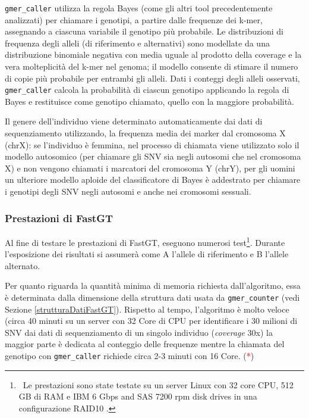 \documentclass[../main.tex]{subfiles}
\begin{document}
\texttt{gmer\_caller} utilizza la regola Bayes (come gli altri tool precedentemente analizzati) per chiamare i genotipi, a partire dalle frequenze dei k-mer, assegnando a ciascuna variabile il genotipo più probabile. Le distribuzioni di frequenza degli alleli (di riferimento e alternativi) sono modellate da una distribuzione binomiale negativa con media uguale al prodotto della coverage e la vera molteplicità del k-mer nel genoma; il modello consente di stimare il numero di copie più probabile per entrambi gli alleli. Dati i conteggi degli alleli osservati, \texttt{gmer\_caller} calcola la probabilità di ciascun genotipo applicando la regola di Bayes e restituisce come genotipo chiamato, quello con la maggiore probabilità. 

Il genere dell'individuo viene determinato automaticamente dai dati di sequenziamento utilizzando, la frequenza media dei marker dal cromosoma X (chrX): se l'individuo è femmina, nel processo di chiamata viene utilizzato solo il modello autosomico (per chiamare gli SNV sia negli autosomi che nel cromosoma X) e non vengono chiamati i marcatori del cromosoma Y (chrY), per gli uomini un ulteriore modello aploide del classificatore di Bayes è addestrato per chiamare i genotipi degli SNV negli autosomi e anche nei cromosomi sessuali.


\subsubsection{Prestazioni di FastGT}

Al fine di testare le prestazioni di FastGT, \cite{pajuste2017fastgt} eseguono numerosi test\footnote{\ Le prestazioni sono state testate su un server Linux con 32 core CPU, 512 GB di RAM e IBM 6 Gbps and SAS 7200 rpm disk drives in una configurazione RAID10 \cite{pajuste2017fastgt}.}. Durante l'esposizione dei risultati si assumerà come A l'allele di riferimento e B l'allele alternato.

Per quanto riguarda la quantità minima di memoria richiesta dall'algoritmo, essa è determinata dalla dimensione della struttura dati usata da \texttt{gmer\_counter} (vedi Sezione \ref{strutturaDatiFastGT}). Rispetto al tempo, l'algoritmo è molto veloce (circa 40 minuti su un server con 32 Core di CPU per identificare i 30 milioni di SNV dai dati di sequenziamento di un singolo individuo (\textit{coverage} 30x) la maggior parte è dedicata al conteggio delle frequenze mentre la chiamata del genotipo con \texttt{gmer\_caller} richiede circa 2-3 minuti con 16 Core. (\textcolor{red}{*})
\end{document}
